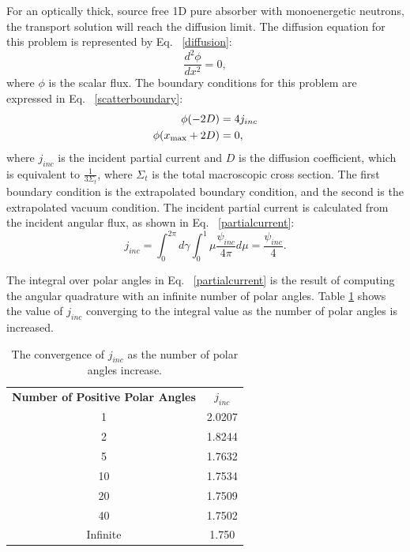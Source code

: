 For an optically thick, source free 1D pure absorber with monoenergetic neutrons, the transport solution will reach the diffusion limit. The diffusion equation for this problem is represented by Eq. ~\eqref{diffusion}:
\begin{equation}
\frac{d^2\phi}{dx^2} = 0,
\label{diffusion}
\end{equation}
where $\phi$ is the scalar flux. The boundary conditions for this problem are expressed in Eq. ~\eqref{scatterboundary}:
\begin{align}
\phi(-2D) &= 4j_{inc} \notag \\
\phi(x_{\text{max}}+2D) &= 0, 
\label{scatterboundary}
\end{align}
where $j_{inc}$ is the incident partial current and $D$ is the diffusion coefficient, which is equivalent to $\frac{1}{3 \Sigma_t}$, where $\Sigma_t$ is the total macroscopic cross section. The first boundary condition is the extrapolated boundary condition, and the second is the extrapolated vacuum condition. The incident partial current is calculated from the incident angular flux, as shown in Eq. ~\eqref{partialcurrent}:
\begin{equation}
j_{inc} = \int_{0}^{2\pi}d\gamma \int_{0}^{1} \mu \frac{\psi_{inc}}{4\pi} d\mu = \frac{\psi_{inc}}{4}.
\label{partialcurrent}
\end{equation}

The integral over polar angles in Eq. ~\eqref{partialcurrent} is the result of computing the angular quadrature with an infinite number of polar angles. Table \ref{angleconvergence} shows the value of $j_{inc}$ converging to the integral value as the number of polar angles is increased. 
\begin{table}[H]
\centering
\caption{The convergence of $j_{inc}$ as the number of polar angles increase.}
\begin{tabular}{c c}
\hline
\textbf{Number of Positive Polar Angles} & \textbf{$j_{inc}$} \\
1 & 2.0207 \\
2 & 1.8244 \\
5 & 1.7632 \\
10 & 1.7534 \\
20 & 1.7509 \\
40 & 1.7502 \\
Infinite & 1.750 \\
\hline
\end{tabular}
\label{angleconvergence}
\end{table}

